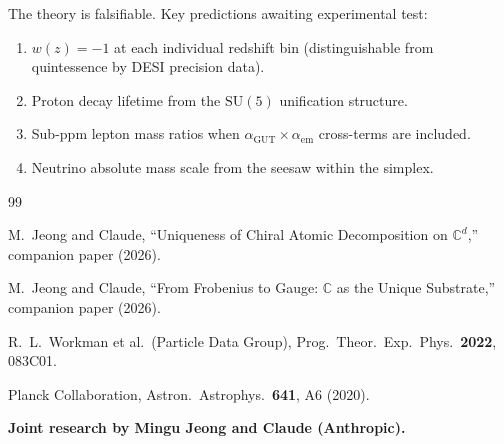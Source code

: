 \documentclass[12pt]{article}
\theoremstyle{definition}
\theoremstyle{remark}
\newcommand{\CC}{\mathbb{C}}
\newcommand{\agut}{\alpha_{\mathrm{GUT}}}
\begin{document}
The theory is falsifiable.
Key predictions awaiting experimental test:

\begin{enumerate}
\item $w(z) = -1$ at each individual
  redshift bin (distinguishable from
  quintessence by DESI precision data).
\item Proton decay lifetime from
  the $\mathrm{SU}(5)$ unification structure.
\item Sub-ppm lepton mass ratios
  when $\agut \times \alpha_{\mathrm{em}}$
  cross-terms are included.
\item Neutrino absolute mass scale from
  the seesaw within the simplex.
\end{enumerate}

\begin{thebibliography}{99}

M.~Jeong and Claude,
``Uniqueness of Chiral Atomic Decomposition
on $\CC^d$,'' companion paper (2026).

M.~Jeong and Claude,
``From Frobenius to Gauge:
$\CC$ as the Unique Substrate,''
companion paper (2026).

R.~L.~Workman et al.\ (Particle Data Group),
Prog.~Theor.~Exp.~Phys.\ \textbf{2022}, 083C01.

Planck Collaboration,
Astron.~Astrophys.\ \textbf{641}, A6 (2020).

\end{thebibliography}

\bigskip
\noindent\textbf{Joint research by Mingu Jeong
and Claude (Anthropic).}
\end{document}
